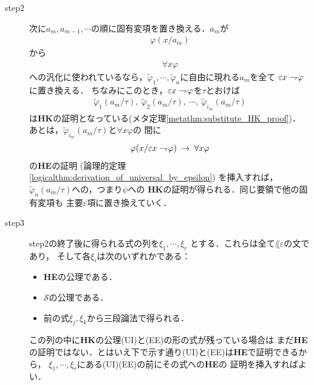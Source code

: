 \begin{metaprf}
\begin{description}
			\item[step2]
				次に$a_{m},a_{m-1},\cdots$の順に固有変項を置き換える．$a_{m}$が
				\begin{align}
					\varphi(x/a_{m})
				\end{align}
				から
				\begin{align}
					\forall x \varphi
				\end{align}
				への汎化に使われているなら，$\widetilde{\varphi}_{1},\cdots,
				\widetilde{\varphi}_{n}$に自由に現れる$a_{m}$を全て
				$\varepsilon x \rightharpoondown\hspace{-0.25em} \varphi$に置き換える．
				ちなみにこのとき，$\varepsilon x \rightharpoondown\hspace{-0.25em} \varphi$を$\tau$とおけば
				\begin{align}
					\widetilde{\varphi}_{1}(a_{m}/\tau),\ 
					\widetilde{\varphi}_{2}(a_{m}/\tau),\ \cdots,\ 
					\widetilde{\varphi}_{i_{m}}(a_{m}/\tau)
				\end{align}
				は{\bf HK}の証明となっている(メタ定理\ref{metathm:substitute_HK_proof})．
				あとは，$\widetilde{\varphi}_{i_{m}}(a_{m}/\tau)$と$\forall x \varphi$の
				間に
				\begin{align}
					\varphi(x/\varepsilon x \rightharpoondown\hspace{-0.25em} \varphi) 
					\hspace{0.25em}\rightarrow\hspace{0.25em} \forall x \varphi
				\end{align}
				の{\bf HE}の証明
				(論理的定理\ref{logicalthm:derivation_of_universal_by_epsilon})
				を挿入すれば，$\widetilde{\varphi}_{n}(a_{m}/\tau)$への，つまり$\psi$への
				{\bf HK}の証明が得られる．同じ要領で他の固有変項も
				主要$\varepsilon$項に置き換えていく．
				
			\item[step3]
				step2の終了後に得られる式の列を$\xi_{1},\cdots,\xi_{r}$
				とする．これらは全て$\lang{\varepsilon}$の文であり，
				そして各$\xi_{i}$は次のいずれかである：
				\begin{itemize}
					\item {\bf HE}の公理である．
					
					\item $\mathscr{S}$の公理である．
					
					\item 前の式$\xi_{j},\xi_{k}$から三段論法で得られる．
				\end{itemize}
			
				この列の中に{\bf HK}の公理(UI)と(EE)の形の式が残っている場合は
				まだ{\bf HE}の証明ではない．とはいえ下で示す通り(UI)と(EE)は{\bf HE}で証明できるから，
				$\xi_{1},\cdots,\xi_{r}$にある(UI)(EE)の前にその式への{\bf HE}の
				証明を挿入すればよい．
				

\end{description}
\end{metaprf}
